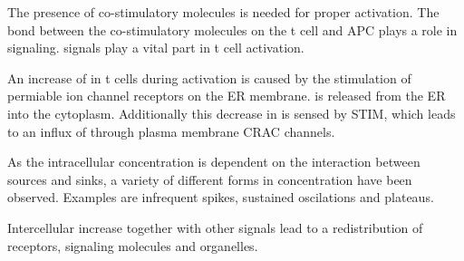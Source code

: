 The presence of co-stimulatory molecules is needed for proper activation. The bond between the co-stimulatory molecules on the t cell and APC plays a role in signaling. \Calcium signals play a vital part in t cell activation.

An increase of \Calcium in t cells during activation is caused by the stimulation of \Calcium permiable ion channel receptors on the ER membrane. \Calcium is released from the ER into the cytoplasm. Additionally this decrease in \Calcium is sensed by STIM, which leads to an influx of \Calcium through plasma membrane CRAC channels.\cite{smith2009}

As the intracellular \Calcium concentration is dependent on the interaction between \Calcium sources and sinks, a variety of different forms in \Calcium concentration have been observed. Examples are infrequent spikes, sustained oscilations and plateaus.\cite{Lewis2001}

Intercellular \Calcium increase together with other signals lead to a redistribution of receptors, signaling molecules and organelles.\cite{joseph2014}
